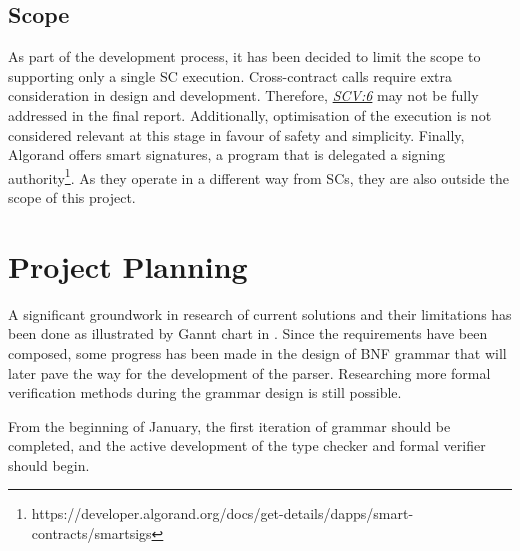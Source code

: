 \documentclass[oneside]{ecsproject}     %
\newcommand{\vref}[1]{\textit{\hyperref[#1]{#1}}}
\begin{document}
\section{Scope}

As part of the development process, it has been decided to limit the scope to supporting only a single SC execution.
Cross-contract calls require extra consideration in design and development. Therefore, \vref{SCV:6} may not be fully addressed in the final report.
Additionally, optimisation of the execution is not considered relevant at this stage in favour of safety and simplicity.
Finally, Algorand offers smart signatures, a program that is delegated a signing authority\footnote{https://developer.algorand.org/docs/get-details/dapps/smart-contracts/smartsigs}.
As they operate in a different way from SCs, they are also outside the scope of this project.

\begingroup
\renewcommand{\cleardoublepage}{}
\renewcommand{\clearpage}{}
\chapter{Project Planning}
\endgroup

A significant groundwork in research of current solutions and their limitations has been done as illustrated by Gannt chart in .
Since the requirements have been composed, some progress has been made in the design of BNF grammar that will later pave the way for the development
of the parser. Researching more formal verification methods during the grammar design is still possible.

From the beginning of January, the first iteration of grammar should be completed, and the active development of the type checker and formal verifier should begin.



\appendix
\end{document}
